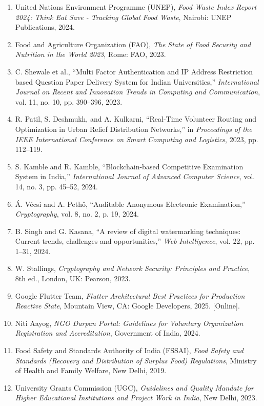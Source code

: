 \documentclass[12pt,a4paper]{article}
\begin{document}
\begin{enumerate}
    \item[{[1]}] United Nations Environment Programme (UNEP), \textit{Food Waste Index Report 2024: Think Eat Save - Tracking Global Food Waste}, Nairobi: UNEP Publications, 2024.
    \item[{[2]}] Food and Agriculture Organization (FAO), \textit{The State of Food Security and Nutrition in the World 2023}, Rome: FAO, 2023.
    \item[{[3]}] C. Shewale et al., ``Multi Factor Authentication and IP Address Restriction based Question Paper Delivery System for Indian Universities,'' \textit{International Journal on Recent and Innovation Trends in Computing and Communication}, vol. 11, no. 10, pp. 390--396, 2023.
    \item[{[4]}] R. Patil, S. Deshmukh, and A. Kulkarni, ``Real-Time Volunteer Routing and Optimization in Urban Relief Distribution Networks,'' in \textit{Proceedings of the IEEE International Conference on Smart Computing and Logistics}, 2023, pp. 112--119.
    \item[{[5]}] S. Kamble and R. Kamble, ``Blockchain-based Competitive Examination System in India,'' \textit{International Journal of Advanced Computer Science}, vol. 14, no. 3, pp. 45--52, 2024.
    \item[{[6]}] \'{A}. V\'{e}csi and A. Peth\H{o}, ``Auditable Anonymous Electronic Examination,'' \textit{Cryptography}, vol. 8, no. 2, p. 19, 2024.
    \item[{[7]}] B. Singh and G. Kasana, ``A review of digital watermarking techniques: Current trends, challenges and opportunities,'' \textit{Web Intelligence}, vol. 22, pp. 1--31, 2024.
    \item[{[8]}] W. Stallings, \textit{Cryptography and Network Security: Principles and Practice}, 8th ed., London, UK: Pearson, 2023.
    \item[{[9]}] Google Flutter Team, \textit{Flutter Architectural Best Practices for Production Reactive State}, Mountain View, CA: Google Developers, 2025. [Online].
    \item[{[10]}] Niti Aayog, \textit{NGO Darpan Portal: Guidelines for Voluntary Organization Registration and Accreditation}, Government of India, 2024.
    \item[{[11]}] Food Safety and Standards Authority of India (FSSAI), \textit{Food Safety and Standards (Recovery and Distribution of Surplus Food) Regulations}, Ministry of Health and Family Welfare, New Delhi, 2019.
    \item[{[12]}] University Grants Commission (UGC), \textit{Guidelines and Quality Mandate for Higher Educational Institutions and Project Work in India}, New Delhi, 2023.
\end{enumerate}
\end{document}
